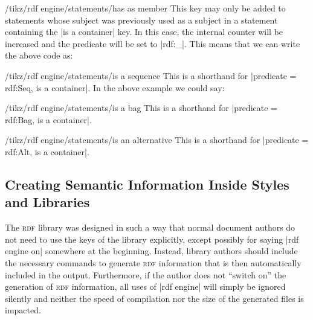 \begin{key}{/tikz/rdf engine/statements/has as member}
    This key may only be added to statements whose subject was previously used
    as a subject in a statement containing the |is a container| key. In this
    case, the internal counter will be increased and the predicate will be set
    to |rdf:_|. This means that we can write the above code as:
\begin{codeexample}
\end{codeexample}
\end{key}

\begin{key}{/tikz/rdf engine/statements/is a sequence}
    This is a shorthand for |predicate = rdf:Seq, is a container|. In the above
    example we could say:
\begin{codeexample}
\end{codeexample}
\end{key}

\begin{key}{/tikz/rdf engine/statements/is a bag}
    This is a shorthand for |predicate = rdf:Bag, is a container|.
\end{key}

\begin{key}{/tikz/rdf engine/statements/is an alternative}
    This is a shorthand for |predicate = rdf:Alt, is a container|.
\end{key}


\subsection{Creating Semantic Information Inside Styles and Libraries}

\begingroup

The \textsc{rdf} library was designed in such a way that normal document
authors do not need to use the keys of the library explicitly, except possibly
for saying |rdf engine on| somewhere at the beginning. Instead, library authors
should include the necessary commands to generate \textsc{rdf} information that
is then automatically included in the output. Furthermore, if the author does
not ``switch on'' the generation of \textsc{rdf} information, all uses of
|rdf engine| will simply be ignored silently and neither the speed of
compilation nor the size of the generated files is impacted.



